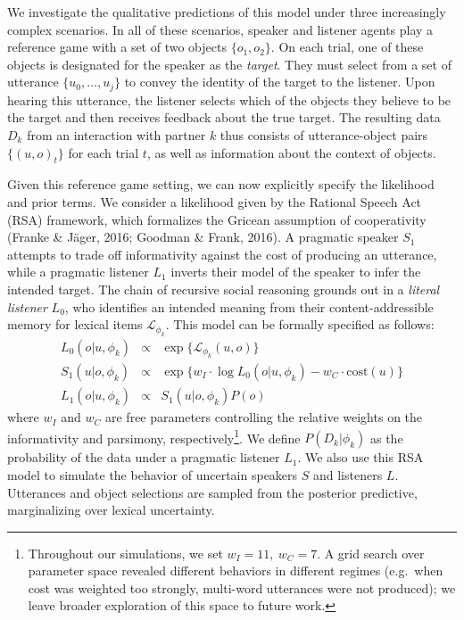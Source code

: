 \documentclass[10pt, letterpaper]{article}
\begin{document}
We investigate the qualitative predictions of this model under three
increasingly complex scenarios. In all of these scenarios, speaker and
listener agents play a reference game with a set of two objects
\(\{o_1, o_2\}\). On each trial, one of these objects is designated for
the speaker as the \emph{target}. They must select from a set of
utterance \(\{u_0, \dots, u_j\}\) to convey the identity of the target
to the listener. Upon hearing this utterance, the listener selects which
of the objects they believe to be the target and then receives feedback
about the true target. The resulting data \(D_k\) from an interaction
with partner \(k\) thus consists of utterance-object pairs
\(\{(u, o)_t\}\) for each trial \(t\), as well as information about the
context of objects.

Given this reference game setting, we can now explicitly specify the
likelihood and prior terms. We consider a likelihood given by the
Rational Speech Act (RSA) framework, which formalizes the Gricean
assumption of cooperativity (Franke \& Jäger, 2016; Goodman \& Frank,
2016). A pragmatic speaker \(S_1\) attempts to trade off informativity
against the cost of producing an utterance, while a pragmatic listener
\(L_1\) inverts their model of the speaker to infer the intended target.
The chain of recursive social reasoning grounds out in a
\emph{literal listener} \(L_0\), who identifies an intended meaning from
their content-addressible memory for lexical items
\(\mathcal{L}_{\phi_k}\). This model can be formally specified as
follows: \[
\begin{array}{rcl}
L_0(o | u, \phi_k) &\propto  & \exp\{\mathcal{L}_{\phi_k}(u,o)\} \\
S_1(u | o, \phi_k) &\propto &  \exp\{w_I \cdot \log L_0(o | u, \phi_k) - w_C \cdot \textrm{cost}(u)\}   \\
L_1(o | u, \phi_k) &\propto  & S_1(u | o, \phi_k) P(o) 
\end{array}
\] where \(w_I\) and \(w_C\) are free parameters controlling the
relative weights on the informativity and parsimony,
respectively\footnote{Throughout our simulations, we set
  \(w_I = 11,~w_C = 7\). A grid search over parameter space revealed
  different behaviors in different regimes (e.g.~when cost was weighted
  too strongly, multi-word utterances were not produced); we leave
  broader exploration of this space to future work.}. We define
\(P(D_k | \phi_k)\) as the probability of the data under a pragmatic
listener \(L_1\). We also use this RSA model to simulate the behavior of
uncertain speakers \(S\) and listeners \(L\). Utterances and object
selections are sampled from the posterior predictive, marginalizing over
lexical uncertainty.
\end{document}

